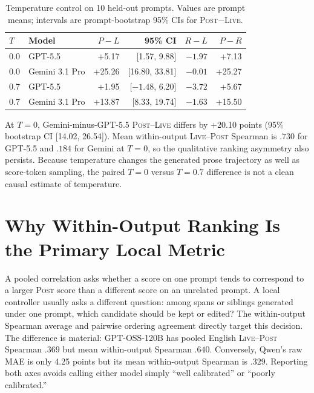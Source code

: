 \documentclass[10pt]{article}
\newcommand{\live}{\textsc{Live}}
\newcommand{\post}{\textsc{Post}}
\newcommand{\papersection}[1]{\Needspace{4.4\baselineskip}\section{#1}}
\begin{document}
\begin{table}[H]
\centering
\small
\setlength{\tabcolsep}{4pt}
\caption{Temperature control on 10 held-out prompts. Values are prompt means; intervals are prompt-bootstrap 95\% CIs for \post{}$-$\live{}.}
\label{tab:temperature}
\begin{tabular}{llrrrr}
\toprule
$T$ & Model & $P-L$ & 95\% CI & $R-L$ & $P-R$ \\
\midrule
0.0 & GPT-5.5 & +5.17 & [1.57, 9.88] & $-1.97$ & +7.13 \\
0.0 & Gemini 3.1 Pro & +25.26 & [16.80, 33.81] & $-0.01$ & +25.27 \\
0.7 & GPT-5.5 & +1.95 & [$-1.48$, 6.20] & $-3.72$ & +5.67 \\
0.7 & Gemini 3.1 Pro & +13.87 & [8.33, 19.74] & $-1.63$ & +15.50 \\
\bottomrule
\end{tabular}
\end{table}
At $T=0$, Gemini-minus-GPT-5.5 \post{}--\live{} differs by +20.10 points (95\% bootstrap CI [14.02, 26.54]). Mean within-output \live{}--\post{} Spearman is $.730$ for GPT-5.5 and $.184$ for Gemini at $T=0$, so the qualitative ranking asymmetry also persists. Because temperature changes the generated prose trajectory as well as score-token sampling, the paired $T=0$ versus $T=0.7$ difference is not a clean causal estimate of temperature.

\papersection{Why Within-Output Ranking Is the Primary Local Metric}
\label{app:ranking}
A pooled correlation asks whether a score on one prompt tends to correspond to a larger \post{} score than a different score on an unrelated prompt. A local controller usually asks a different question: among spans or siblings generated under one prompt, which candidate should be kept or edited? The within-output Spearman average and pairwise ordering agreement directly target this decision. The difference is material: GPT-OSS-120B has pooled English \live{}--\post{} Spearman $.369$ but mean within-output Spearman $.640$. Conversely, Qwen's raw MAE is only 4.25 points but its mean within-output Spearman is $.329$. Reporting both axes avoids calling either model simply ``well calibrated'' or ``poorly calibrated.''
\end{document}
